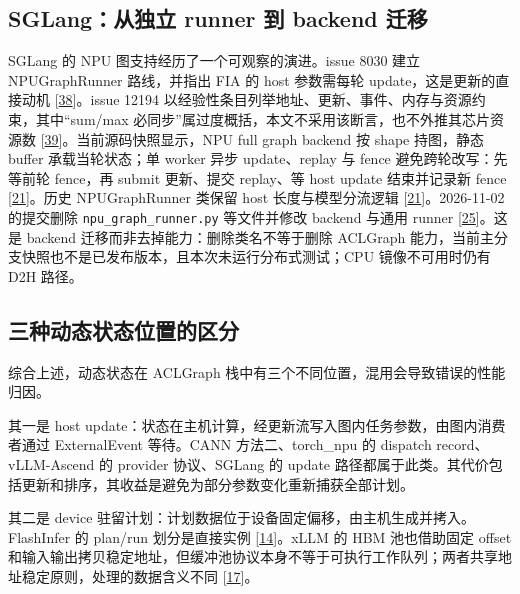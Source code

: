 \documentclass[
  UTF8,
  zihao=5]{ctexart}
\begin{document}
\hypertarget{sglangux4eceux72ecux7acb-runner-ux5230-backend-ux8fc1ux79fb}{%
\subsection{SGLang：从独立 runner 到 backend
迁移}\label{sglangux4eceux72ecux7acb-runner-ux5230-backend-ux8fc1ux79fb}}

SGLang 的 NPU 图支持经历了一个可观察的演进。issue 8030 建立
NPUGraphRunner 路线，并指出 FIA 的 host 参数需每轮
update，这是更新的直接动机
{[}\protect\hyperlink{ref-sglang8030}{38}{]}。issue 12194
以经验性条目列举地址、更新、事件、内存与资源约束，其中``sum/max
必同步''属过度概括，本文不采用该断言，也不外推其芯片资源数
{[}\protect\hyperlink{ref-sglang12194}{39}{]}。当前源码快照显示，NPU
full graph backend 按 shape 持图，静态 buffer 承载当轮状态；单 worker
异步 update、replay 与 fence 避免跨轮改写：先等前轮 fence，再 submit
更新、提交 replay、等 host update 结束并记录新 fence
{[}\protect\hyperlink{ref-sglang2026impl}{21}{]}。历史 NPUGraphRunner
类保留 host 长度与模型分流逻辑
{[}\protect\hyperlink{ref-sglang2026impl}{21}{]}。2026-11-02 的提交删除
\texttt{npu\_graph\_runner.py} 等文件并修改 backend 与通用 runner
{[}\protect\hyperlink{ref-sglang2026refactor}{25}{]}。这是 backend
迁移而非去掉能力：删除类名不等于删除 ACLGraph
能力，当前主分支快照也不是已发布版本，且本次未运行分布式测试；CPU
镜像不可用时仍有 D2H 路径。

\hypertarget{ux4e09ux79cdux52a8ux6001ux72b6ux6001ux4f4dux7f6eux7684ux533aux5206}{%
\subsection{三种动态状态位置的区分}\label{ux4e09ux79cdux52a8ux6001ux72b6ux6001ux4f4dux7f6eux7684ux533aux5206}}

综合上述，动态状态在 ACLGraph
栈中有三个不同位置，混用会导致错误的性能归因。

其一是 host
update：状态在主机计算，经更新流写入图内任务参数，由图内消费者通过
ExternalEvent 等待。CANN 方法二、torch\_npu 的 dispatch
record、vLLM-Ascend 的 provider 协议、SGLang 的 update
路径都属于此类。其代价包括更新和排序，其收益是避免为部分参数变化重新捕获全部计划。

其二是 device
驻留计划：计划数据位于设备固定偏移，由主机生成并拷入。FlashInfer 的
plan/run 划分是直接实例
{[}\protect\hyperlink{ref-ye2025flashinfer}{14}{]}。xLLM 的 HBM
池也借助固定 offset
和输入输出拷贝稳定地址，但缓冲池协议本身不等于可执行工作队列；两者共享地址稳定原则，处理的数据含义不同
{[}\protect\hyperlink{ref-liu2025xllm}{17}{]}。
\end{document}
